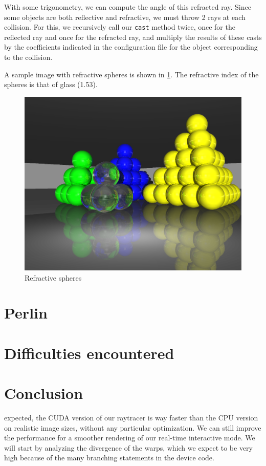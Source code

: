 \documentclass[a4paper,12pt,journal,twoside,compsoc]{PPIEEEtran}
\begin{document}
With some trigonometry, we can compute the angle of this refracted ray.  Since
some objects are both reflective and refractive, we must throw 2 rays at each
collision.  For this, we recursively call our \texttt{cast} method twice, once
for the reflected ray and once for the refracted ray, and multiply the results
of these casts by the coefficients indicated in the configuration file for the
object corresponding to the collision.

A sample image with refractive spheres is shown in \cref{fig:sample-refr}.  The
refractive index of the spheres is that of glass (1.53).

\begin{figure}
  \begin{center}
    \includegraphics[width=0.7\linewidth]{sample-refraction.png}
  \end{center}
  \caption{Refractive spheres}
  \label{fig:sample-refr}
\end{figure}

\section{Perlin}

\section{Difficulties encountered}

\section{Conclusion}
\label{concl}
 expected, the CUDA version of our raytracer is way faster than the CPU version on realistic image sizes, without any particular optimization.  We can still improve the performance for a smoother rendering of our real-time interactive mode.  We will start by analyzing the divergence of the warps, which we expect to be very high because of the many branching statements in the device code.




\newpage
\onecolumn
\end{document}
